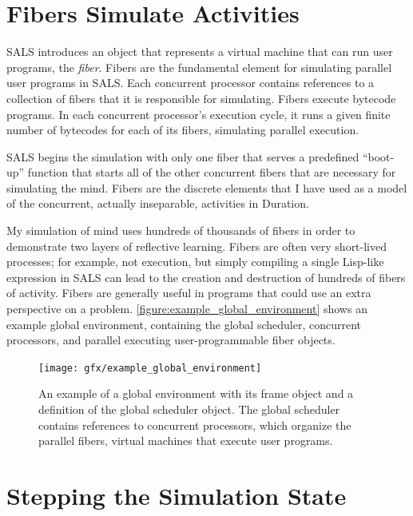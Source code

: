 \section{Fibers Simulate Activities}

SALS introduces an object that represents a virtual machine that can
run user programs, the \emph{fiber}.  Fibers are the fundamental
element for simulating parallel user programs in SALS.  Each
concurrent processor contains references to a collection of fibers
that it is responsible for simulating.  Fibers execute bytecode
programs.  In each concurrent processor's execution cycle, it runs a
given finite number of bytecodes for each of its fibers, simulating
parallel execution.

SALS begins the simulation with only one fiber that serves a
predefined ``boot-up'' function that starts all of the other
concurrent fibers that are necessary for simulating the mind.  Fibers
are the discrete elements that I have used as a model of the
concurrent, actually inseparable, activities in Duration.

My simulation of mind uses hundreds of thousands of fibers in order to
demonstrate two layers of reflective learning.  Fibers are often very
short-lived processes; for example, not execution, but simply
compiling a single Lisp-like expression in SALS can lead to the
creation and destruction of hundreds of fibers of activity.  Fibers
are generally useful in programs that could use an extra perspective
on a problem.  {\mbox{\autoref{figure:example_global_environment}}}
shows an example global environment, containing the global scheduler,
concurrent processors, and parallel executing user-programmable fiber
objects.
\begin{figure}
\center
\texttt{[image: gfx/example\_global\_environment]}
\caption[An example of a global environment with concurrent processors
  and parallel fibers.]{An example of a global environment with its
  frame object and a definition of the global scheduler object.  The
  global scheduler contains references to concurrent processors, which
  organize the parallel fibers, virtual machines that execute user
  programs.}
\label{figure:example_global_environment}
\end{figure}

\section{Stepping the Simulation State}

